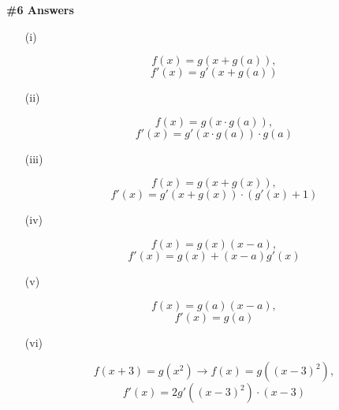\documentclass[a4paper,12pt]{report}
\begin{document}
\noindent
\textbf{\#6 Answers}
\begin{enumerate}
\item[(i)]
\begin{sloppypar}
\[f(x)=g(x+g(a)),\]
\[f'(x)=g'(x+g(a))\]
\end{sloppypar}
\item[(ii)]
\begin{sloppypar}
\[f(x)=g(x\cdot{g(a)}),\]
\[f'(x)=g'(x\cdot{g(a)})\cdot{g(a)}\]
\end{sloppypar}
\item[(iii)]
\begin{sloppypar}
\[f(x)=g(x + g(x)),\]
\[f'(x)=g'(x + g(x))\cdot{(g'(x)+1)}\]
\end{sloppypar}
\item[(iv)]
\begin{sloppypar}
\[f(x)=g(x)(x - a),\]
\[f'(x)=g(x)+(x-a)g'(x)\]
\end{sloppypar}
\item[(v)]
\begin{sloppypar}
\[f(x)=g(a)(x - a),\]
\[f'(x)=g(a)\]
\end{sloppypar}
\item[(vi)]
\begin{sloppypar}
\[f(x+3)=g(x^2)\rightarrow f(x)=g((x-3)^2),\]
\[f'(x)=2g'((x-3)^2)\cdot{(x-3)}\]
\end{sloppypar}
\end{enumerate}
\end{document}
